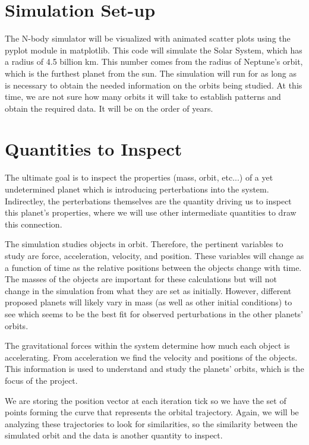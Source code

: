 \documentclass[a4paper,12pt]{article} %
\numberwithin{equation}{section} %
\numberwithin{figure}{section} %
\begin{document}
\section{Simulation Set-up}
The N-body simulator will be visualized with animated scatter plots using the pyplot module in matplotlib. This code will simulate the Solar System, which has a radius of 4.5 billion km. This number comes from the radius of Neptune’s orbit, which is the furthest planet from the sun. The simulation will run for as long as is necessary to obtain the needed information on the orbits being studied. At this time, we are not sure how many orbits it will take to establish patterns and obtain the required data. It will be on the order of years.


\section{Quantities to Inspect}
The ultimate goal is to inspect the properties (mass, orbit, etc...) of a yet undetermined planet which is introducing perterbations into the system. Indirectley, the perterbations themselves are the quantity driving us to inspect this planet's properties, where we will use other intermediate quantities to draw this connection.
\par
The simulation studies objects in orbit. Therefore, the pertinent variables to study are force, acceleration, velocity, and position. These variables will change as a function of time as the relative positions between the objects change with time. The masses of the objects are important for these calculations but will not change in the simulation from what they are set as initially. However, different proposed planets will likely vary in mass (as well as other initial conditions) to see which seems to be the best fit for observed perturbations in the other planets’ orbits.
\par
The gravitational forces within the system determine how much each object is accelerating. From acceleration we find the velocity and positions of the objects. This information is used to understand and study the planets’ orbits, which is the focus of the project.
\par
We are storing the position vector at each iteration tick so we have the set of points forming the curve that represents the orbital trajectory.  Again, we will be analyzing these trajectories to look for similarities, so the similarity between the simulated orbit and the data is another quantity to inspect.





\end{document}

